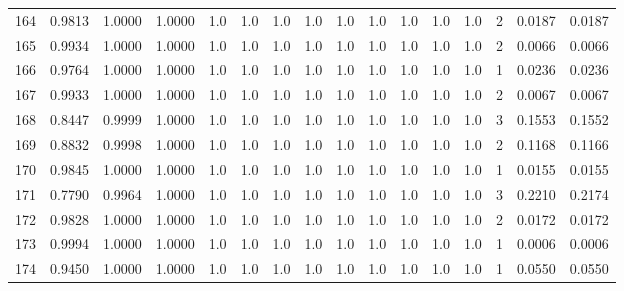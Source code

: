\begin{tabular}{lrrrrrrrrrrrrrrr}
164 &      0.9813 &  1.0000 &  1.0000 &     1.0 &     1.0 &     1.0 &     1.0 &     1.0 &     1.0 &     1.0 &      1.0 &        1.0 &      2 &                    0.0187 &                     0.0187 \\
165 &      0.9934 &  1.0000 &  1.0000 &     1.0 &     1.0 &     1.0 &     1.0 &     1.0 &     1.0 &     1.0 &      1.0 &        1.0 &      2 &                    0.0066 &                     0.0066 \\
166 &      0.9764 &  1.0000 &  1.0000 &     1.0 &     1.0 &     1.0 &     1.0 &     1.0 &     1.0 &     1.0 &      1.0 &        1.0 &      1 &                    0.0236 &                     0.0236 \\
167 &      0.9933 &  1.0000 &  1.0000 &     1.0 &     1.0 &     1.0 &     1.0 &     1.0 &     1.0 &     1.0 &      1.0 &        1.0 &      2 &                    0.0067 &                     0.0067 \\
168 &      0.8447 &  0.9999 &  1.0000 &     1.0 &     1.0 &     1.0 &     1.0 &     1.0 &     1.0 &     1.0 &      1.0 &        1.0 &      3 &                    0.1553 &                     0.1552 \\
169 &      0.8832 &  0.9998 &  1.0000 &     1.0 &     1.0 &     1.0 &     1.0 &     1.0 &     1.0 &     1.0 &      1.0 &        1.0 &      2 &                    0.1168 &                     0.1166 \\
170 &      0.9845 &  1.0000 &  1.0000 &     1.0 &     1.0 &     1.0 &     1.0 &     1.0 &     1.0 &     1.0 &      1.0 &        1.0 &      1 &                    0.0155 &                     0.0155 \\
171 &      0.7790 &  0.9964 &  1.0000 &     1.0 &     1.0 &     1.0 &     1.0 &     1.0 &     1.0 &     1.0 &      1.0 &        1.0 &      3 &                    0.2210 &                     0.2174 \\
172 &      0.9828 &  1.0000 &  1.0000 &     1.0 &     1.0 &     1.0 &     1.0 &     1.0 &     1.0 &     1.0 &      1.0 &        1.0 &      2 &                    0.0172 &                     0.0172 \\
173 &      0.9994 &  1.0000 &  1.0000 &     1.0 &     1.0 &     1.0 &     1.0 &     1.0 &     1.0 &     1.0 &      1.0 &        1.0 &      1 &                    0.0006 &                     0.0006 \\
174 &      0.9450 &  1.0000 &  1.0000 &     1.0 &     1.0 &     1.0 &     1.0 &     1.0 &     1.0 &     1.0 &      1.0 &        1.0 &      1 &                    0.0550 &                     0.0550 \\

\end{tabular}
